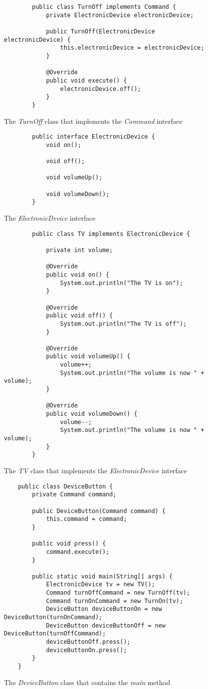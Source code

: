 \begin{figure}[H]
	\begin{lstlisting}
		public class TurnOff implements Command {
			private ElectronicDevice electronicDevice;
			
			public TurnOff(ElectronicDevice electronicDevice) {
				this.electronicDevice = electronicDevice;
			}
			
			@Override
			public void execute() {
				electronicDevice.off();
			}
		}
	\end{lstlisting}
	\caption{The \textit{TurnOff} class that implements the \textit{Command} interface}
	\label{fig11}
\end{figure}
\begin{figure}[H]
	\begin{lstlisting}
		public interface ElectronicDevice {
			void on();
			
			void off();
			
			void volumeUp();
			
			void volumeDown();
		}
	\end{lstlisting}
	\caption{The \textit{ElectronicDevice} interface}
	\label{fig12}
\end{figure}
\begin{figure}[H]
	\begin{lstlisting}
		public class TV implements ElectronicDevice {
			
			private int volume;
			
			@Override
			public void on() {
				System.out.println("The TV is on");
			}
			
			@Override
			public void off() {
				System.out.println("The TV is off");
			}
			
			@Override
			public void volumeUp() {
				volume++;
				System.out.println("The volume is now " + volume);
			}
			
			@Override
			public void volumeDown() {
				volume--;
				System.out.println("The volume is now " + volume);
			}
		}
	\end{lstlisting}
	\caption{The \textit{TV} class that implements the \textit{ElectronicDevice} interface}
	\label{fig13}
\end{figure}
\begin{figure}[H]
	\begin{lstlisting}
	public class DeviceButton {
		private Command command;
		
		public DeviceButton(Command command) {
			this.command = command;
		}
		
		public void press() {
			command.execute();
		}
		
		public static void main(String[] args) {
			ElectronicDevice tv = new TV();
			Command turnOffCommand = new TurnOff(tv);
			Command turnOnCommand = new TurnOn(tv);
			DeviceButton deviceButtonOn = new DeviceButton(turnOnCommand);
			DeviceButton deviceButtonOff = new DeviceButton(turnOffCommand);
			deviceButtonOff.press();
			deviceButtonOn.press();
		}
	}
	\end{lstlisting}
	\caption{The \textit{DeviceButton} class that contains the \textit{main} method}
	\label{fig14}
\end{figure}
